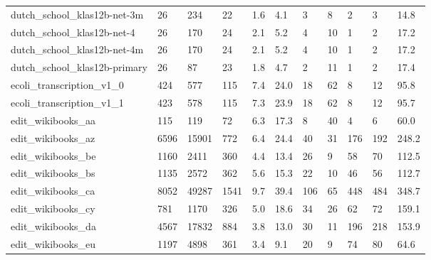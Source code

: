 \begin{longtable}{lllllllllll}
 dutch\_school\_klas12b-net-3m                        & 26         & 234       & 22    & 1.6    & 4.1    & 3     & 8      & 2      & 3      & 14.8    \\
 dutch\_school\_klas12b-net-4                         & 26         & 170       & 24    & 2.1    & 5.2    & 4     & 10     & 1      & 2      & 17.2    \\
 dutch\_school\_klas12b-net-4m                        & 26         & 170       & 24    & 2.1    & 5.2    & 4     & 10     & 1      & 2      & 17.2    \\
 dutch\_school\_klas12b-primary                       & 26         & 87        & 23    & 1.8    & 4.7    & 2     & 11     & 1      & 2      & 17.4    \\
 ecoli\_transcription\_v1\_0                           & 424        & 577       & 115   & 7.4    & 24.0   & 18    & 62     & 8      & 12     & 95.8    \\
 ecoli\_transcription\_v1\_1                           & 423        & 578       & 115   & 7.3    & 23.9   & 18    & 62     & 8      & 12     & 95.7    \\
 edit\_wikibooks\_aa                                  & 115        & 119       & 72    & 6.3    & 17.3   & 8     & 40     & 4      & 6      & 60.0    \\
 edit\_wikibooks\_az                                  & 6596       & 15901     & 772   & 6.4    & 24.4   & 40    & 31     & 176    & 192    & 248.2   \\
 edit\_wikibooks\_be                                  & 1160       & 2411      & 360   & 4.4    & 13.4   & 26    & 9      & 58     & 70     & 112.5   \\
 edit\_wikibooks\_bs                                  & 1135       & 2572      & 362   & 5.6    & 15.3   & 22    & 10     & 46     & 56     & 112.7   \\
 edit\_wikibooks\_ca                                  & 8052       & 49287     & 1541  & 9.7    & 39.4   & 106   & 65     & 448    & 484    & 348.7   \\
 edit\_wikibooks\_cy                                  & 781        & 1170      & 326   & 5.0    & 18.6   & 34    & 26     & 62     & 72     & 159.1   \\
 edit\_wikibooks\_da                                  & 4567       & 17832     & 884   & 3.8    & 13.0   & 30    & 11     & 196    & 218    & 153.9   \\
 edit\_wikibooks\_eu                                  & 1197       & 4898      & 361   & 3.4    & 9.1    & 20    & 9      & 74     & 80     & 64.6    \\

\end{longtable}
